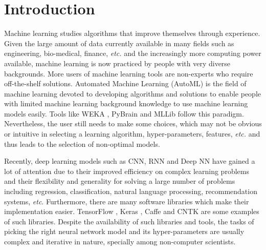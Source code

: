 \documentclass[preprint,12pt]{elsarticle}%
\begin{document}
%


\section{Introduction}

Machine learning studies algorithms that improve themselves through experience. Given the large amount of data currently available in many fields such as engineering, bio-medical, finance, \textit{etc.} and the increasingly more computing power available, machine learning is now practiced by people with very diverse backgrounds. More users of machine learning tools are non-experts who require off-the-shelf solutions. Automated Machine Learning (AutoML) is the field of machine learning devoted to developing algorithms and solutions to enable people with limited machine learning background knowledge to use machine learning models easily. Tools like WEKA \cite{Hall2009}, PyBrain \cite{Schaul2010} and MLLib \cite{mlib2017} follow this paradigm. Nevertheless, the user still needs to make some choices, which may not be obvious or intuitive in selecting a learning algorithm, hyper-parameters, features, \textit{etc.} and thus leads to the selection of non-optimal models.

Recently, deep learning models such as CNN, RNN and Deep NN have gained a lot of attention due to their improved efficiency on complex learning problems and their flexibility and generality for solving a large number of problems including regression, classification, natural language processing, recommendation systems, \textit{etc}. Furthermore, there are many software libraries which make their implementation easier. TensorFlow \cite{TensorFlow2015}, Keras \cite{keras2015}, Caffe \cite{caffe2014} and CNTK \cite{cntk2016} are some examples of such libraries. Despite the availability of such libraries and tools, the tasks of picking the right neural network model and its hyper-parameters are usually complex and iterative in nature, specially among non-computer scientists.
\end{document}
